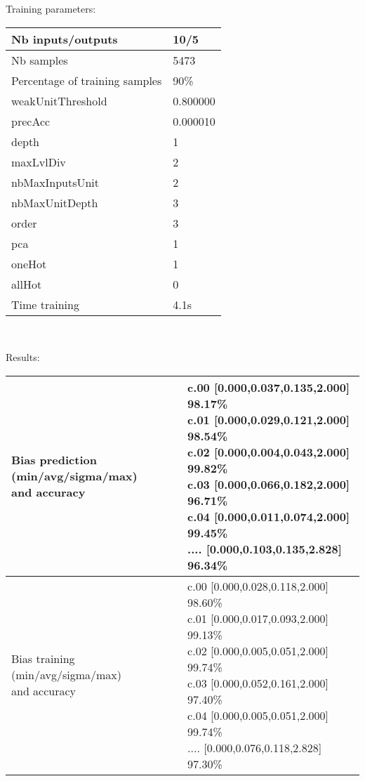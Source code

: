Training parameters:\\
\begin{center}
\begin{tabular}{|l|l|}
\hline
Nb inputs/outputs&10/5\\
\hline
Nb samples&5473\\
\hline
Percentage of training samples&90\%\\
\hline
weakUnitThreshold&0.800000\\
\hline
precAcc&0.000010\\
\hline
depth&1\\
\hline
maxLvlDiv&2\\
\hline
nbMaxInputsUnit&2\\
\hline
nbMaxUnitDepth&3\\
\hline
order&3\\
\hline
pca&1\\
\hline
oneHot&1\\
\hline
allHot&0\\
\hline
Time training&4.1s\\
\hline
\end{tabular}\\
\end{center}\newline
Results:
\begin{center}
\begin{tabular}{|l|l|}
\hline
\makecell{Bias prediction (min/avg/sigma/max)\\and accuracy}&\makecell{c.00 [0.000,0.037,0.135,2.000] 98.17\%\\
c.01 [0.000,0.029,0.121,2.000] 98.54\%\\
c.02 [0.000,0.004,0.043,2.000] 99.82\%\\
c.03 [0.000,0.066,0.182,2.000] 96.71\%\\
c.04 [0.000,0.011,0.074,2.000] 99.45\%\\
.... [0.000,0.103,0.135,2.828] 96.34\%\\
}\\

\hline
\makecell{Bias training (min/avg/sigma/max)\\and accuracy}&\makecell{c.00 [0.000,0.028,0.118,2.000] 98.60\%\\
c.01 [0.000,0.017,0.093,2.000] 99.13\%\\
c.02 [0.000,0.005,0.051,2.000] 99.74\%\\
c.03 [0.000,0.052,0.161,2.000] 97.40\%\\
c.04 [0.000,0.005,0.051,2.000] 99.74\%\\
.... [0.000,0.076,0.118,2.828] 97.30\%\\
}\\
\hline
\end{tabular}\
\end{center}
